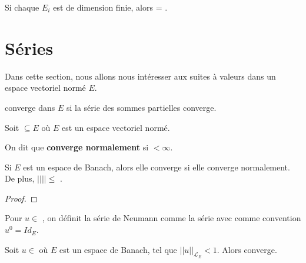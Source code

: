 \begin{proposition}
	Si chaque $E_{i}$ est de dimension finie, alors  = .
\end{proposition}

\section{Séries}

Dans cette section, nous allons nous intéresser aux suites
 à valeurs dans un espace vectoriel normé $E$.

\begin{definition}
\label{definition_serie_convergence}
	 converge dans $E$ si
	la série des sommes partielles converge.
\end{definition}

\begin{definition}
\label{definition_serie_normal_convergence}
	Soit  $\subseteq E$ où $E$ est un espace
	vectoriel normé.

	On dit que  \textbf{converge normalement} si
	 $< \infty$.
\end{definition}

\begin{proposition}
\label{proposition_normal_imply_convergence}
	Si $E$ est un espace de Banach, alors  elle
	converge si elle converge normalement. De plus,
	$||$$|| \leq $
	.
\end{proposition}

\begin{proof}
	
\end{proof}

\begin{definition}
\label{definition_neumann_serie}
	Pour $u \in$ , on définit la série de Neumann comme la
	série  avec comme convention $u^{0} = Id_{E}$.
\end{definition}

\begin{proposition}
	Soit $u \in$  où $E$ est un espace de Banach, tel que
	$||u||_{\mathcal{L}_{E}} < 1$. Alors
	 converge.
\end{proposition}

